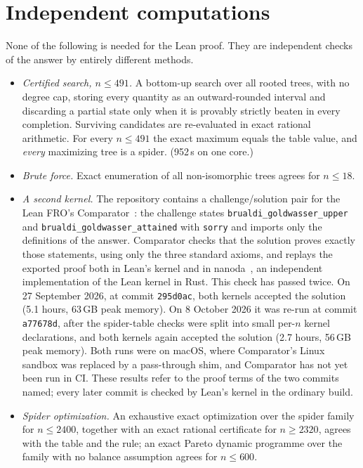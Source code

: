 \documentclass[11pt]{article}
\theoremstyle{definition}
\newcommand{\lean}[1]{\texttt{#1}}
\begin{document}
\section{Independent computations}\label{sec:indep}

None of the following is needed for the Lean proof. They are independent checks of the answer by
entirely different methods.

\begin{itemize}
\item \emph{Certified search, $n\le491$.} A bottom-up search over all rooted trees, with no degree cap,
  storing every quantity as an outward-rounded interval and discarding a partial state only when it is
  provably strictly beaten in every completion. Surviving candidates are re-evaluated in exact rational
  arithmetic. For every $n\le491$ the exact maximum equals the table value, and \emph{every} maximizing
  tree is a spider. (952\,s on one core.)
\item \emph{Brute force.} Exact enumeration of all non-isomorphic trees agrees for $n\le18$.
\item \emph{A second kernel.} The repository contains a challenge/solution pair for the Lean FRO's
  Comparator~\cite{Comparator}: the challenge states \lean{brualdi\_goldwasser\_upper} and
  \lean{brualdi\_goldwasser\_attained} with \lean{sorry} and imports only the definitions of the answer.
  Comparator checks that the solution proves exactly those statements, using only the three standard
  axioms, and replays the exported proof both in Lean's kernel and in nanoda~\cite{nanoda}, an
  independent implementation of the Lean kernel in Rust. This check has passed twice. On 27 September 2026,
  at commit \texttt{295d0ac}, both kernels accepted the solution (5.1 hours, 63\,GB peak memory). On
  8 October 2026 it was re-run at commit \texttt{a77678d}, after the spider-table checks were split into
  small per-$n$ kernel declarations, and both kernels again accepted the solution (2.7 hours, 56\,GB peak
  memory). Both runs were on macOS, where Comparator's Linux sandbox was replaced by a pass-through shim,
  and Comparator has not yet been run in CI. These results refer to the proof terms of the two commits named; every
  later commit is checked by Lean's kernel in the ordinary build.
\item \emph{Spider optimization.} An exhaustive exact optimization over the spider family for
  $n\le2400$, together with an exact rational certificate for $n\ge2320$, agrees with the table and the
  rule; an exact Pareto dynamic programme over the family with no balance assumption agrees for
  $n\le600$.
\end{itemize}
\end{document}
